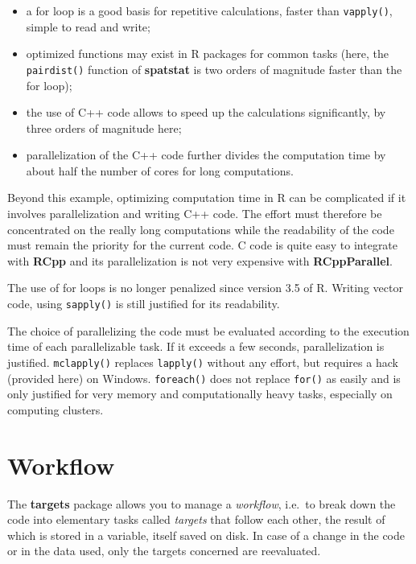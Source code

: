 \documentclass[
  12pt,
  american,
  a4paper,
  extrafontsizes,onecolumn,openright
  ]{memoir}
\providecommand{\tightlist}{%
  \setlength{\itemsep}{0pt}\setlength{\parskip}{0pt}}
\begin{document}
\begin{itemize}
\tightlist
\item
  a for loop is a good basis for repetitive calculations, faster than \texttt{vapply()}, simple to read and write;
\item
  optimized functions may exist in R packages for common tasks (here, the \texttt{pairdist()} function of \textbf{spatstat} is two orders of magnitude faster than the for loop);
\item
  the use of C++ code allows to speed up the calculations significantly, by three orders of magnitude here;
\item
  parallelization of the C++ code further divides the computation time by about half the number of cores for long computations.
\end{itemize}

Beyond this example, optimizing computation time in R can be complicated if it involves parallelization and writing C++ code.
The effort must therefore be concentrated on the really long computations while the readability of the code must remain the priority for the current code.
C code is quite easy to integrate with \textbf{RCpp} and its parallelization is not very expensive with \textbf{RCppParallel}.

The use of for loops is no longer penalized since version 3.5 of R.
Writing vector code, using \texttt{sapply()} is still justified for its readability.

The choice of parallelizing the code must be evaluated according to the execution time of each parallelizable task.
If it exceeds a few seconds, parallelization is justified.
\texttt{mclapply()} replaces \texttt{lapply()} without any effort, but requires a hack (provided here) on Windows.
\texttt{foreach()} does not replace \texttt{for()} as easily and is only justified for very memory and computationally heavy tasks, especially on computing clusters.

\hypertarget{sec:targets}{%
\section{Workflow}\label{sec:targets}}

The \textbf{targets} package allows you to manage a \emph{workflow}, i.e.~to break down the code into elementary tasks called \emph{targets} that follow each other, the result of which is stored in a variable, itself saved on disk.
In case of a change in the code or in the data used, only the targets concerned are reevaluated.
\end{document}
